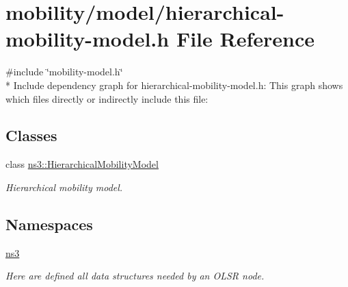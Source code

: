 \hypertarget{hierarchical-mobility-model_8h}{}\section{mobility/model/hierarchical-\/mobility-\/model.h File Reference}
\label{hierarchical-mobility-model_8h}
{\ttfamily \#include \char`\"{}mobility-\/model.\+h\char`\"{}}\\*
Include dependency graph for hierarchical-\/mobility-\/model.h\+:
This graph shows which files directly or indirectly include this file\+:
\subsection*{Classes}
\begin{DoxyCompactItemize}
\item 
class \hyperlink{classns3_1_1HierarchicalMobilityModel}{ns3\+::\+Hierarchical\+Mobility\+Model}
\begin{DoxyCompactList}\small\item\em Hierarchical mobility model. \end{DoxyCompactList}\end{DoxyCompactItemize}
\subsection*{Namespaces}
\begin{DoxyCompactItemize}
\item 
 \hyperlink{namespacens3}{ns3}
\begin{DoxyCompactList}\small\item\em Here are defined all data structures needed by an O\+L\+SR node. \end{DoxyCompactList}\end{DoxyCompactItemize}
